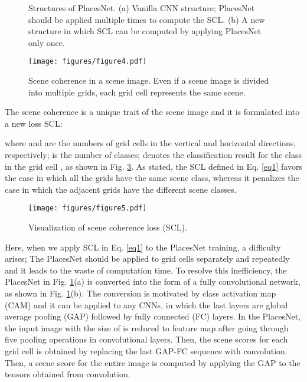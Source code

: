 \documentclass[journal,comsoc]{IEEEtran}
\begin{document}
\begin{figure}[!t]
\centering
{}

\caption{Structures of PlacesNet. (a) Vanilla CNN structure; PlacesNet should be applied multiple times to compute the SCL. (b) A new structure in which SCL can be computed by applying PlacesNet only once.}
\label{fig3}
\end{figure}


\begin{figure}[!t]
\centering
\texttt{[image: figures/figure4.pdf]}
\caption{Scene coherence in a scene image. Even if a scene image is divided into multiple grids, each grid cell represents the same scene.}
\label{fig4}
\end{figure}

The scene coherence is a unique trait of the scene image and it is formulated into a new loss SCL:

where  and  are the numbers of grid cells in the vertical and horizontal directions, respectively;  is the number of classes;  denotes the classification result for the class  in the grid cell , as shown in Fig. \ref{fig5}. As stated, the SCL defined in Eq. \ref{eq1} favors the case in which all the grids have the same scene class, whereas it penalizes the case in which the adjacent grids have the different scene classes.


\begin{figure}[!t]
\centering
\texttt{[image: figures/figure5.pdf]}
\caption{Visualization of scene coherence loss (SCL).}
\label{fig5}
\end{figure}


Here, when we apply SCL in Eq. \ref{eq1} to the PlacesNet training, a difficulty arises; The PlacesNet should be applied to  grid cells separately and repeatedly and it leads to the waste of computation time. To resolve this inefficiency, the PlacesNet in Fig. \ref{fig3}(a) is converted into the form of a fully convolutional network, as shown in Fig. \ref{fig3}(b). The conversion is motivated by class activation map (CAM) \cite{b25} and it can be applied to any CNNs, in which the last layers are global average pooling (GAP) followed by fully connected (FC) layers. In the PlacesNet, the input image with the size of  is reduced to  feature map after going through five pooling operations in convolutional layers. Then, the scene scores for each  grid cell is obtained by replacing the last GAP-FC sequence with  convolution. Then, a scene score for the entire image is computed by applying the GAP to the tensors obtained from  convolution.
\end{document}
